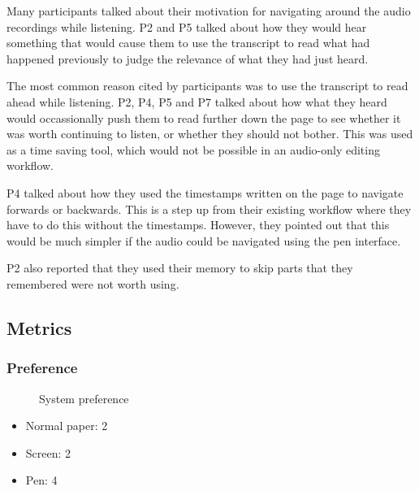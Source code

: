 Many participants talked about their motivation for navigating around the audio recordings while listening. P2 and P5
talked about how they would hear something that would cause them to use the transcript to read what had happened
previously to judge the relevance of what they had just heard.

The most common reason cited by participants was to use the transcript to read ahead while listening. P2, P4, P5 and P7
talked about how what they heard would occassionally push them to read further down the page to see whether it was
worth continuing to listen, or whether they should not bother. This was used as a time saving tool, which would not be
possible in an audio-only editing workflow.

P4 talked about how they used the timestamps written on the page to navigate forwards or backwards. This is a step up
from their existing workflow where they have to do this without the timestamps. However, they pointed out that this
would be much simpler if the audio could be navigated using the pen interface.

P2 also reported that they used their memory to skip parts that they remembered were not worth using.

\subsection{Metrics}

\subsubsection{Preference}

\begin{figure}[h]
  \centering
  \label{fig:preference}
  \caption{System preference}
\end{figure}

\begin{itemize}
  \item Normal paper: 2
  \item Screen: 2
  \item Pen: 4
\end{itemize}

